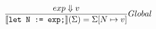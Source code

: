 \documentclass[acmsmall,review,anonymous]{acmart}\settopmatter{printfolios=true}
\begin{document}
\begin{align*}
	\judge{&Global}{
		exp \Downarrow v
	}{
		\semfunc[let N := exp;](\Sigma) = \Sigma [N \mapsto v]
	}
\end{align*}







\newpage

%



\newpage


% 

%
\end{document}
